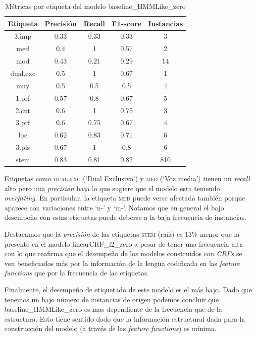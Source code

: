 \documentclass[letterpaper,12pt,oneside]{book}
\theoremstyle{definition}
\begin{document}
\begin{table}[ht]
    \centering
    \begin{tabular}{| c | c | c | c | c |}\hline
        \textbf{Etiqueta} & \textbf{Precisión} & \textbf{Recall} & \textbf{F1-score} & \textbf{Instancias} \\\hline
        3.imp & 0.33 & 0.33 & 0.33 & 3\\
        med & 0.4 & 1 & 0.57 & 2\\
        mod & 0.43 & 0.21 & 0.29 & 14\\
        dual.exc & 0.5 & 1 & 0.67 & 1\\
        muy & 0.5 & 0.5 & 0.5 & 4\\
        1.prf & 0.57 & 0.8 & 0.67 & 5\\
        2.cnt & 0.6 & 1 & 0.75 & 3\\
        3.prf & 0.6 & 0.75 & 0.67 & 4\\
        loc & 0.62 & 0.83 & 0.71 & 6\\
        3.pls & 0.67 & 1 & 0.8 & 6\\
        stem & 0.83 & 0.81 & 0.82 & 810\\\hline
    \end{tabular}
    \caption{Métricas por etiqueta del modelo \textsf{baseline\_HMMLike\_zero}}
    \label{tab:tags-hmmlike}
\end{table}

Etiquetas como \textsc{dual.exc} (`Dual Exclusivo') y \textsc{med} (`Voz media') tienen un \textit{recall} alto pero una \textit{precisión} baja lo que sugiere que el modelo esta teniendo \textit{overfitting}. En particular, la etiqueta \textsc{med} puede verse afectada también porque aparece con variaciones entre `n-' y `m-'. Notamos que en general el bajo desempeño con estas etiquetas puede deberse a la baja frecuencia de instancias. 

Destacamos que la \textit{precisión} de las etiquetas \textsc{stem} (raíz) es $13\%$ menor que la presente en el modelo \textsf{linearCRF\_l2\_zero} a pesar de tener una frecuencia alta con lo que reafirma que el desempeño de los modelos construidos con \textit{CRFs} se ven beneficiados más por la información de la lengua codificada en las \textit{feature functions} que por la frecuencia de las etiquetas.

Finalmente, el desempeño de etiquetado de este modelo es el más bajo. Dado que tenemos un bajo número de instancias de origen podemos concluir que \textsf{baseline\_HMMLike\_zero} es mas dependiente de la frecuencia que de la estructura. Esto tiene sentido dado que la información estructural dada para la construcción del modelo (a través de las \textit{feature functions}) es mínima.
\end{document}
